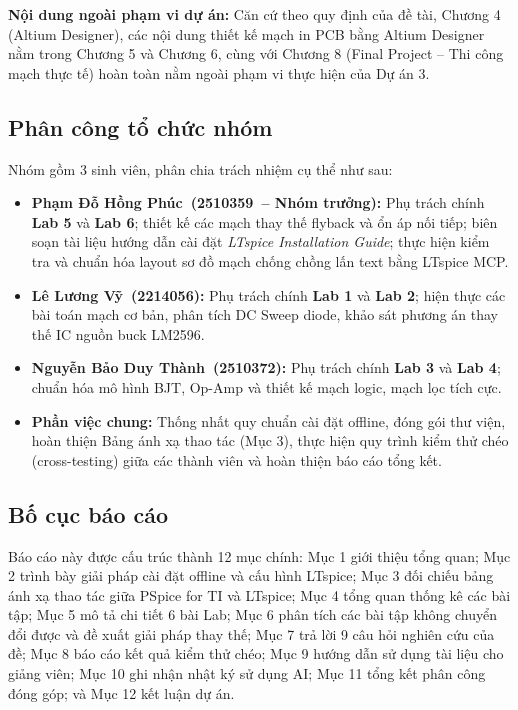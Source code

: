 \documentclass[12pt,a4paper]{article}
\newcommand{\TVa}{Phạm Đỗ Hồng Phúc}   \newcommand{\MSa}{2510359}   \newcommand{\PTa}{-- Lab 5, Lab 6}  %
\newcommand{\TVb}{Lê Lương Vỹ}          \newcommand{\MSb}{2214056}   \newcommand{\PTb}{-- Lab 1, Lab 2}  %
\newcommand{\TVc}{Nguyễn Bảo Duy Thành} \newcommand{\MSc}{2510372}   \newcommand{\PTc}{-- Lab 3, Lab 4}  %
\begin{document}
\textbf{Nội dung ngoài phạm vi dự án:} Căn cứ theo quy định của đề tài, Chương 4 (Altium Designer), các nội dung thiết kế mạch in PCB bằng Altium Designer nằm trong Chương 5 và Chương 6, cùng với Chương 8 (Final Project -- Thi công mạch thực tế) hoàn toàn nằm ngoài phạm vi thực hiện của Dự án 3.

\subsection{Phân công tổ chức nhóm}
Nhóm gồm 3 sinh viên, phân chia trách nhiệm cụ thể như sau:
\begin{itemize}[itemsep=2pt]
  \item \textbf{\TVa\ (\MSa\ -- Nhóm trưởng):} Phụ trách chính \textbf{Lab 5} và \textbf{Lab 6}; thiết kế các mạch thay thế flyback và ổn áp nối tiếp; biên soạn tài liệu hướng dẫn cài đặt \textit{LTspice Installation Guide}; thực hiện kiểm tra và chuẩn hóa layout sơ đồ mạch chống chồng lấn text bằng LTspice MCP.
  \item \textbf{\TVb\ (\MSb):} Phụ trách chính \textbf{Lab 1} và \textbf{Lab 2}; hiện thực các bài toán mạch cơ bản, phân tích DC Sweep diode, khảo sát phương án thay thế IC nguồn buck LM2596.
  \item \textbf{\TVc\ (\MSc):} Phụ trách chính \textbf{Lab 3} và \textbf{Lab 4}; chuẩn hóa mô hình BJT, Op-Amp và thiết kế mạch logic, mạch lọc tích cực.
  \item \textbf{Phần việc chung:} Thống nhất quy chuẩn cài đặt offline, đóng gói thư viện, hoàn thiện Bảng ánh xạ thao tác (Mục 3), thực hiện quy trình kiểm thử chéo (cross-testing) giữa các thành viên và hoàn thiện báo cáo tổng kết.
\end{itemize}

\subsection{Bố cục báo cáo}
Báo cáo này được cấu trúc thành 12 mục chính: Mục 1 giới thiệu tổng quan; Mục 2 trình bày giải pháp cài đặt offline và cấu hình LTspice; Mục 3 đối chiếu bảng ánh xạ thao tác giữa PSpice for TI và LTspice; Mục 4 tổng quan thống kê các bài tập; Mục 5 mô tả chi tiết 6 bài Lab; Mục 6 phân tích các bài tập không chuyển đổi được và đề xuất giải pháp thay thế; Mục 7 trả lời 9 câu hỏi nghiên cứu của đề; Mục 8 báo cáo kết quả kiểm thử chéo; Mục 9 hướng dẫn sử dụng tài liệu cho giảng viên; Mục 10 ghi nhận nhật ký sử dụng AI; Mục 11 tổng kết phân công đóng góp; và Mục 12 kết luận dự án.
\end{document}
